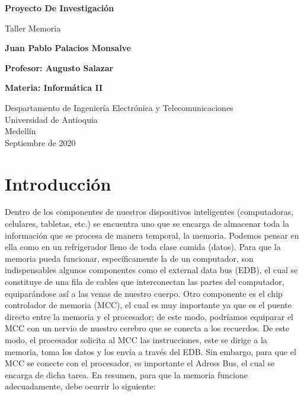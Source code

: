 \documentclass{article}
\begin{document}
\begin{titlepage}
    \begin{center}
        \vspace*{1cm}
            
        \Huge
        \textbf{Proyecto De Investigación}
            
        \vspace{0.5cm}
        \LARGE
        Taller Memoria
            
        \vspace{1.5cm}
            
        \textbf{Juan Pablo Palacios Monsalve}
            
      
        
        \vspace{2.0cm}
        \textbf{Profesor: Augusto Salazar}
      
    
        \textbf{Materia: Informática II}
      
        \vfill
        
        \vspace{0.8cm}
     
        \Large
        Despartamento de Ingeniería Electrónica y Telecomunicaciones\\
        Universidad de Antioquia\\
        Medellín\\
        Septiembre de 2020
      
    \end{center}
\end{titlepage}

\tableofcontents
\newpage
\section{Introducción}\label{intro}
Dentro de los componentes de nuestros dispositivos inteligentes (computadoras, celulares, tabletas, etc.) se encuentra uno que se encarga de almacenar toda la información que se procesa de manera temporal, la memoria. Podemos pensar en ella como en un refrigerador lleno de toda clase comida (datos). Para que la memoria pueda funcionar, específicamente la de un computador, son indispensables algunos componentes como el external data bus (EDB), el cual se constituye de una fila de cables que interconectan las partes del computador, equiparándose así a las venas de nuestro cuerpo. Otro componente es el chip controlador de memoria (MCC), el cual es muy importante ya que es el puente directo entre la memoria y el procesador; de este modo, podríamos equiparar el MCC con un nervio de nuestro cerebro que se conecta a los recuerdos. De este modo, el procesador solicita al MCC las instrucciones, este se dirige a la memoria, toma los datos y los envía a través del EDB. Sin embargo, para que el MCC se conecte con el procesador, es importante el Adress Bus, el cual se encarga de dicha tarea. En resumen, para que la memoria funcione adecuadamente, debe ocurrir lo siguiente:
\vspace{0.2cm}
 
\end{document}
